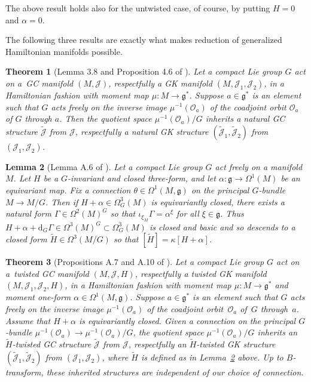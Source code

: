\documentclass[11pt]{article}
\newtheorem{Theorem}{Theorem}[section]
\newtheorem{Lemma}[Theorem]{Lemma}
\numberwithin{equation}{section}
\newcommand{\func}[3]{#1 \colon #2 \to #3}
\begin{document}
The above result holds also for the untwisted case, of course, by putting $H=0$ and $\alpha=0$.


The following three results are exactly what makes reduction of generalized Hamiltonian manifolds possible.


\begin{Theorem}[Lemma 3.8 and Proposition 4.6 of \cite{lintolman}] \label{thm4}
Let a compact Lie group $G$ act on a~GC manifold $(M,\mathcal{J})$, respectfully a GK manifold $(M,\mathcal{J}_1,\mathcal{J}_2)$, in a Hamiltonian fashion with moment map $\func{\mu}{M}{\mathfrak{g}^*}$.  Suppose $a \in \mathfrak{g}^*$ is an element such that $G$ acts freely on the inverse image $\mu^{-1}(\mathcal{O}_a)$ of the coadjoint orbit $\mathcal{O}_a$ of $G$ through $a$.  Then the quotient space $\mu^{-1}(\mathcal{O}_a) / G$ inherits a natural GC structure $\widetilde{\mathcal{J}}$ from $\mathcal{J}$, respectfully a natural GK structure $(\widetilde{\mathcal{J}}_1,\widetilde{\mathcal{J}}_2)$ from~$(\mathcal{J}_1,\mathcal{J}_2)$.
\end{Theorem}


\begin{Lemma}[Lemma A.6 of \cite{lintolman}]
\label{lem2}
Let a compact Lie group $G$ act freely on a manifold $M$.  Let $H$ be a $G$-invariant and closed three-form, and let $\func{\alpha}{\mathfrak{g}}{\Omega^1(M)}$ be an equivariant map.  Fix a connection $\theta \in \Omega^1(M, \mathfrak{g})$ on the principal $G$-bundle $M \to M/G$.  Then if $H+\alpha \in \Omega_G^3(M)$ is equivariantly closed, there exists a natural form $\Gamma \in \Omega^2(M)^G$ so that $\iota_{\xi_M} \Gamma = \alpha^{\xi}$ for all $\xi \in \mathfrak{g}$.  Thus $H + \alpha + \mathrm{d}_G \Gamma \in \Omega^3(M)^G \subset \Omega_G^3(M)$ is closed and basic and so descends to a closed form $\widetilde{H} \in \Omega^3(M/G)$ so that $[\widetilde{H}] = \kappa[H+\alpha]$.
\end{Lemma}


\begin{Theorem}[Propositions A.7 and A.10 of \cite{lintolman}] \label{thm5}
Let a compact Lie group $G$ act on a~twisted GC manifold $(M,\mathcal{J},H)$, respectfully a twisted GK manifold $(M,\mathcal{J}_1,\mathcal{J}_2,H)$, in a Hamiltonian fashion with moment map $\func{\mu}{M}{\mathfrak{g}^*}$ and moment one-form $\alpha \in \Omega^1(M,\mathfrak{g})$.  Suppose $a \in \mathfrak{g}^*$ is an element such that $G$ acts freely on the inverse image $\mu^{-1}(\mathcal{O}_a)$ of the coadjoint orbit~$\mathcal{O}_a$ of~$G$ through~$a$.  Assume that $H+\alpha$ is equivariantly closed.
Given a connection on the principal $G$-bundle $\mu^{-1}(\mathcal{O}_a) \to \mu^{-1}(\mathcal{O}_a)/G$, the quotient space $\mu^{-1}(\mathcal{O}_a) / G$ inherits an $\widetilde{H}$-twisted GC structure $\widetilde{\mathcal{J}}$ from $\mathcal{J}$, respectfully an $\widetilde{H}$-twisted GK structure $(\widetilde{\mathcal{J}}_1,\widetilde{\mathcal{J}}_2)$ from $(\mathcal{J}_1,\mathcal{J}_2)$, where $\widetilde{H}$ is defined as in Lemma~{\rm \ref{lem2}} above.  Up to $B$-transform, these inherited structures are independent of our choice of connection.
\end{Theorem}
\end{document}
